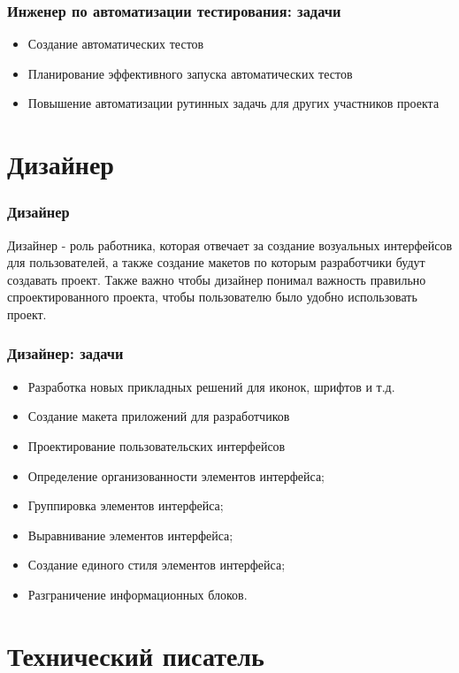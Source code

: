 \documentclass{../industrial-development}
\begin{document}
	\begin{frame} \frametitle{Инженер по автоматизации тестирования: задачи}
			\begin{itemize}
				\item Создание автоматических тестов
				\item Планирование эффективного запуска автоматических тестов
				\item Повышение автоматизации рутинных задачь для других участников проекта		
			\end{itemize}
	\end{frame}
	
	\section{Дизайнер }
	
	\begin{frame} \frametitle{Дизайнер}
		\begin{block}{}
			\alert {Дизайнер} - роль работника, которая отвечает за создание возуальных интерфейсов для пользователей, а также создание макетов по которым разработчики будут создавать проект. Также важно чтобы дизайнер понимал важность правильно спроектированного проекта, чтобы пользователю было удобно использовать проект.
		\end{block}
		
	\end{frame}
	
	\begin{frame} \frametitle{Дизайнер: задачи}
			\begin{itemize}
				\item Разработка новых прикладных решений для иконок, шрифтов и т.д.
				\item Создание макета приложений для разработчиков
				\item Проектирование пользовательских интерфейсов
				\item Определение организованности элементов интерфейса;
				\item Группировка элементов интерфейса;
				\item Выравнивание элементов интерфейса;
				\item Создание единого стиля элементов интерфейса;
				\item Разграничение информационных блоков.
			\end{itemize}
	\end{frame}
	
	
	\section{Технический писатель }
	
\end{document}

